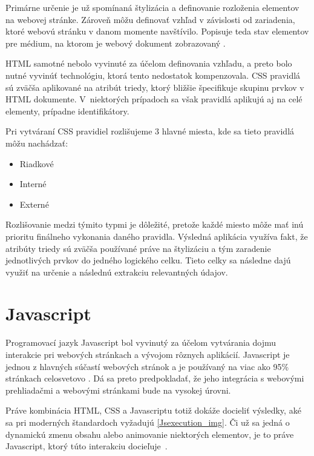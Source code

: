 Primárne určenie je už spomínaná štylizácia a definovanie rozloženia elementov na webovej stránke. Zároveň môžu definovať vzhľad v závislosti od zariadenia, ktoré webovú stránku v danom momente navštívilo. Popisuje teda stav elementov pre médium, na ktorom je webový dokument zobrazovaný \cite{CSS}. 

HTML samotné nebolo vyvinuté za účelom definovania vzhľadu, a preto bolo nutné vyvinúť technológiu, ktorá tento nedostatok kompenzovala. CSS pravidlá sú zväčša aplikované na atribút triedy, ktorý bližšie špecifikuje skupinu prvkov v HTML dokumente. V~niektorých prípadoch sa však pravidlá aplikujú aj na celé elementy, prípadne identifikátory.

Pri vytváraní CSS pravidiel rozlišujeme 3 hlavné miesta, kde sa tieto pravidlá môžu nachádzať:

\begin{itemize}
    \item {Riadkové}
    \item {Interné}
    \item {Externé}
\end{itemize}

Rozlišovanie medzi týmito typmi je dôležité, pretože každé miesto môže mať inú prioritu finálneho vykonania daného pravidla. Výsledná aplikácia využíva fakt, že atribúty triedy sú zväčša používané práve na štylizáciu a tým zaradenie jednotlivých prvkov do jedného logického celku. Tieto celky sa následne dajú využiť na určenie a následnú extrakciu relevantných údajov.

\section{Javascript}

Programovací jazyk Javascript bol vyvinutý za účelom vytvárania dojmu interakcie pri webových stránkach a vývojom rôznych aplikácií. Javascript je jednou z hlavných súčastí webových stránok a je používaný na viac ako 95\% stránkach celosvetovo \cite{HowPopular}. Dá sa preto predpokladať, že jeho integrácia s webovými prehliadačmi a webovými stránkami bude na vysokej úrovni. 

\bigskip

Práve kombinácia HTML, CSS a Javascriptu totiž dokáže docieliť výsledky, aké sa pri moderných štandardoch vyžadujú \ref{Jsexecution_img}. Či už sa jedná o dynamickú zmenu obsahu alebo animovanie niektorých elementov, je to práve Javascript, ktorý túto interakciu docieľuje~\cite{Javascript}. 


